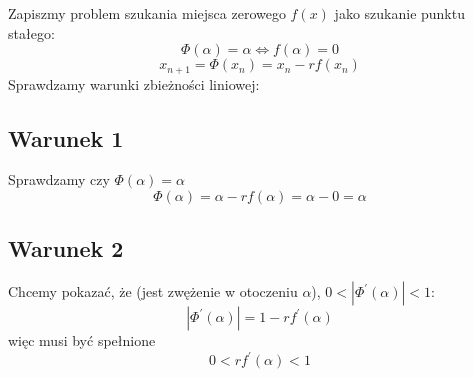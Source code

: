 \documentclass{article}
\title{}
\date{28.10.2020}
\begin{document}
Zapiszmy problem szukania miejsca zerowego $f(x)$ jako szukanie punktu stałego:
\begin{equation}
\Phi(\alpha) = \alpha \iff f(\alpha) = 0
\end{equation}
\begin{equation}
x_{n+1} = \Phi(x_n) = x_n - rf(x_n)
\end{equation}
Sprawdzamy warunki zbieżności liniowej:
\subsection*{Warunek 1}
Sprawdzamy czy $\Phi(\alpha) = \alpha$
\begin{equation}
\Phi(\alpha) = \alpha - rf(\alpha) = \alpha - 0 = \alpha
\end{equation}
\subsection*{Warunek 2}
Chcemy pokazać, że (jest zwężenie w otoczeniu $\alpha$), $0 < |\Phi^\prime(\alpha)| < 1$:
\begin{equation}
|\Phi^\prime(\alpha)| = 1 - rf^\prime(\alpha)
\end{equation}
więc musi być spełnione
\begin{equation}
0 < rf^\prime(\alpha) < 1
\end{equation}
\end{document}

